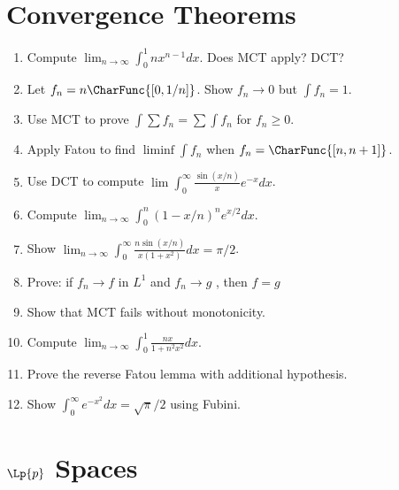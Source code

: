 \section{Convergence Theorems}

\begin{enumerate}
    \item Compute $\lim_{n \to \infty} \int_0^1 nx^{n-1} dx$. Does MCT apply? DCT?
    \item Let $f_n = n \CharFunc{[0, 1/n]}$. Show $f_n \to 0$ \almosteverywhere{} but $\int f_n = 1$.
    \item Use MCT to prove $\int \sum f_n = \sum \int f_n$ for $f_n \geq 0$.
    \item Apply Fatou to find $\liminf \int f_n$ when $f_n = \CharFunc{[n, n+1]}$.
    \item Use DCT to compute $\lim \int_0^\infty \frac{\sin(x/n)}{x} e^{-x} dx$.
    \item Compute $\lim_{n \to \infty} \int_0^n (1 - x/n)^n e^{x/2} dx$.
    \item Show $\lim_{n \to \infty} \int_0^\infty \frac{n \sin(x/n)}{x(1+x^2)} dx = \pi/2$.
    \item Prove: if $f_n \to f$ in $L^1$ and $f_n \to g$ \almosteverywhere{}, then $f = g$ \almosteverywhere{}
    \item Show that MCT fails without monotonicity.
    \item Compute $\lim_{n \to \infty} \int_0^1 \frac{nx}{1+n^2x^2} dx$.
    \item Prove the reverse Fatou lemma with additional hypothesis.
    \item Show $\int_0^\infty e^{-x^2} dx = \sqrt{\pi}/2$ using Fubini.
\end{enumerate}

\section{$\Lp{p}$ Spaces}

